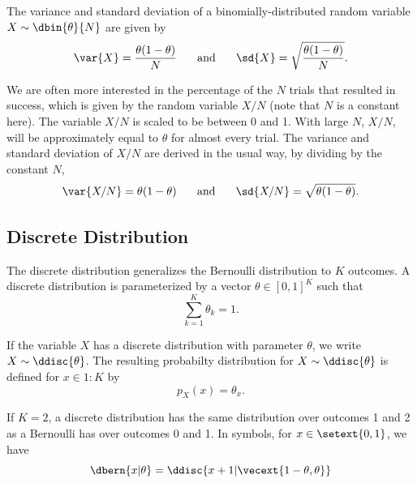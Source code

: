 The variance and standard deviation of a binomially-distributed random
variable $X \sim \dbin{\theta}{N}$ are given by
%
\begin{equation}
\hfill
\var{X} = \frac{\theta (1 - \theta)}{N} 
\hspace*{0.25in}
\mbox{and}
\hspace*{0.25in}
\sd{X} = \sqrt{\frac{\theta (1 - \theta)}{N}}.
\hfill
\end{equation}
%

We are often more interested in the percentage of the $N$ trials that
resulted in success, which is given by the random variable $X/N$ (note
that $N$ is a constant here).  The variable $X/N$ is scaled to be
between 0 and 1.  With large $N$, $X/N$, will be approximately equal
to $\theta$ for almost every trial.  The variance and standard
deviation of $X/N$ are derived in the usual way, by dividing by the
constant $N$,
%
\begin{equation}
\var{X/N} = \theta (1 - \theta) 
\hspace*{0.25in}
\mbox{and}
\hspace*{0.25in}
\sd{X/N} = \sqrt{\theta (1-\theta)}.
\end{equation}


\subsection{Discrete Distribution}

The discrete distribution generalizes the Bernoulli distribution to
$K$ outcomes.  A discrete distribution is parameterized by a vector
$\theta \in [0,1]^K$ such that
%
\begin{equation}
\sum_{k=1}^K \theta_k = 1.
\end{equation}

If the variable $X$ has a discrete distribution with parameter
$\theta$, we write $X \sim \ddisc{\theta}$.  The resulting probabilty
distribution for $X \sim \ddisc{\theta}$ is defined for $x \in 1{:}K$
by
%
\begin{equation}
p_X(x) = \theta_x.
\end{equation}
%

If $K=2$, a discrete distribution has the same distribution
over outcomes 1 and 2 as a Bernoulli has over outcomes 0 and 1.  
In symbols, for $x \in \setext{0,1}$, we have
%
\begin{equation}
\dbern{x|\theta} = \ddisc{x+1|\vecext{1-\theta,\theta}}
\end{equation}

